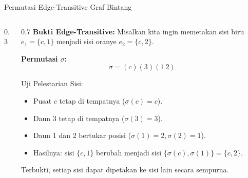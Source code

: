 \documentclass[aspectratio=169]{beamer}
\begin{document}
\begin{frame}[fragile]{Permutasi Edge-Transitive Graf Bintang}
  \begin{columns}
    \begin{column}{0.3\textwidth}
    \end{column}

    \begin{column}{0.7\textwidth}
      \small
      \textbf{Bukti Edge-Transitive:}
      Misalkan kita ingin memetakan sisi biru $e_1 = \{c, 1\}$ menjadi sisi oranye $e_2 = \{c, 2\}$.

      \textbf{Permutasi $\sigma$:}
      $$ \sigma = (c)(3)(1\ 2) $$

      Uji Pelestarian Sisi:
      \begin{itemize}
        \item Pusat $c$ tetap di tempatnya ($\sigma(c) = c$).
        \item Daun 3 tetap di tempatnya ($\sigma(3) = 3$).
        \item Daun 1 dan 2 bertukar posisi ($\sigma(1) = 2, \sigma(2) = 1$).
        \item Hasilnya: sisi $\{c, 1\}$ berubah menjadi sisi $\{\sigma(c), \sigma(1)\} = \{c, 2\}$.
      \end{itemize}
      Terbukti, setiap sisi dapat dipetakan ke sisi lain secara sempurna.
    \end{column}
  \end{columns}
\end{frame}
\end{document}
